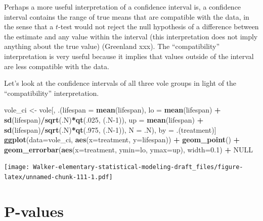 \documentclass[]{book}
\newenvironment{Shaded}{\begin{snugshade}}{\end{snugshade}}
\newcommand{\DataTypeTok}[1]{\textcolor[rgb]{0.13,0.29,0.53}{#1}}
\newcommand{\DecValTok}[1]{\textcolor[rgb]{0.00,0.00,0.81}{#1}}
\newcommand{\FloatTok}[1]{\textcolor[rgb]{0.00,0.00,0.81}{#1}}
\newcommand{\KeywordTok}[1]{\textcolor[rgb]{0.13,0.29,0.53}{\textbf{#1}}}
\newcommand{\NormalTok}[1]{#1}
\newcommand{\OperatorTok}[1]{\textcolor[rgb]{0.81,0.36,0.00}{\textbf{#1}}}
\newcommand{\OtherTok}[1]{\textcolor[rgb]{0.56,0.35,0.01}{#1}}
\newcommand{\StringTok}[1]{\textcolor[rgb]{0.31,0.60,0.02}{#1}}
\begin{document}
Perhaps a more useful interpretation of a confidence interval is, a confidence interval contains the range of true means that are compatible with the data, in the sense that a \(t\)-test would not reject the null hypothesis of a difference between the estimate and any value within the interval (this interpretation does not imply anything about the true value) (Greenland xxx). The ``compatibility'' interpretation is very useful because it implies that values outside of the interval are less compatible with the data.

Let's look at the confidence intervals of all three vole groups in light of the ``compatibility'' interpretation.

\begin{Shaded}
\begin{Highlighting}[]
\NormalTok{vole_ci <-}\StringTok{ }\NormalTok{vole[, .(}\DataTypeTok{lifespan =} \KeywordTok{mean}\NormalTok{(lifespan),}
                    \DataTypeTok{lo =} \KeywordTok{mean}\NormalTok{(lifespan) }\OperatorTok{+}\StringTok{ }\KeywordTok{sd}\NormalTok{(lifespan)}\OperatorTok{/}\KeywordTok{sqrt}\NormalTok{(.N)}\OperatorTok{*}\KeywordTok{qt}\NormalTok{(.}\DecValTok{025}\NormalTok{, (.N}\DecValTok{-1}\NormalTok{)),}
                    \DataTypeTok{up =} \KeywordTok{mean}\NormalTok{(lifespan) }\OperatorTok{+}\StringTok{ }\KeywordTok{sd}\NormalTok{(lifespan)}\OperatorTok{/}\KeywordTok{sqrt}\NormalTok{(.N)}\OperatorTok{*}\KeywordTok{qt}\NormalTok{(.}\DecValTok{975}\NormalTok{, (.N}\DecValTok{-1}\NormalTok{)),}
                    \DataTypeTok{N =}\NormalTok{ .N),}
\NormalTok{                by =}\StringTok{ }\NormalTok{.(treatment)]}
\KeywordTok{ggplot}\NormalTok{(}\DataTypeTok{data=}\NormalTok{vole_ci, }\KeywordTok{aes}\NormalTok{(}\DataTypeTok{x=}\NormalTok{treatment, }\DataTypeTok{y=}\NormalTok{lifespan)) }\OperatorTok{+}
\StringTok{  }\KeywordTok{geom_point}\NormalTok{() }\OperatorTok{+}
\StringTok{  }\KeywordTok{geom_errorbar}\NormalTok{(}\KeywordTok{aes}\NormalTok{(}\DataTypeTok{x=}\NormalTok{treatment, }\DataTypeTok{ymin=}\NormalTok{lo, }\DataTypeTok{ymax=}\NormalTok{up), }
                \DataTypeTok{width=}\FloatTok{0.1}\NormalTok{) }\OperatorTok{+}
\StringTok{  }\OtherTok{NULL}
\end{Highlighting}
\end{Shaded}

\texttt{[image: Walker-elementary-statistical-modeling-draft\_files/figure-latex/unnamed-chunk-111-1.pdf]}

\hypertarget{p-values}{%
\chapter{P-values}\label{p-values}}
\end{document}
